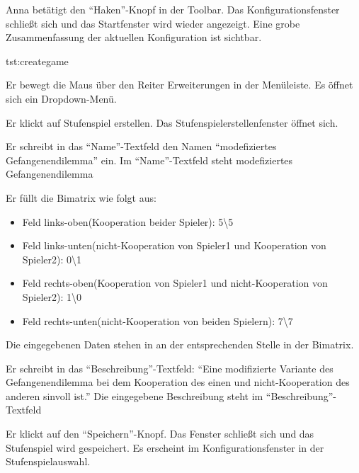 \documentclass[parskip=full,11pt]{scrartcl}
\begin{document}
{Anna betätigt den \enquote{Haken}-Knopf in der Toolbar.}
{Das Konfigurationsfenster schließt sich und das Startfenster wird wieder angezeigt. Eine grobe Zusammenfassung der aktuellen Konfiguration ist sichtbar.}

{tst:creategame}

{Er bewegt die Maus über den Reiter Erweiterungen in der Menüleiste.}
{Es öffnet sich ein Dropdown-Menü.}

{Er klickt auf Stufenspiel erstellen.}
{Das Stufenspielerstellenfenster öffnet sich.}

{Er schreibt in das \enquote{Name}-Textfeld den Namen \enquote{modefiziertes Gefangenendilemma} ein.}
{Im \enquote{Name}-Textfeld steht modefiziertes Gefangenendilemma}

{Er füllt die Bimatrix wie folgt aus:
\begin{itemize}
\item Feld links-oben(Kooperation beider Spieler): 5\textbackslash 5
\item Feld links-unten(nicht-Kooperation von Spieler1 und Kooperation von Spieler2): 0\textbackslash 1
\item Feld rechts-oben(Kooperation von Spieler1 und nicht-Kooperation von Spieler2): 1\textbackslash 0
\item Feld rechts-unten(nicht-Kooperation von beiden Spielern): 7\textbackslash 7
\end{itemize}}
{Die eingegebenen Daten stehen in an der entsprechenden Stelle in der Bimatrix.}

{Er schreibt in das \enquote{Beschreibung}-Textfeld: \enquote{Eine modifizierte Variante des Gefangenendilemma bei dem Kooperation des einen und nicht-Kooperation des anderen sinvoll ist.}}
{Die eingegebene Beschreibung steht im \enquote{Beschreibung}-Textfeld}

{Er klickt auf den \enquote{Speichern}-Knopf.}
{Das Fenster schließt sich und das Stufenspiel wird gespeichert. Es erscheint im Konfigurationsfenster in der Stufenspielauswahl.}
\end{document}
